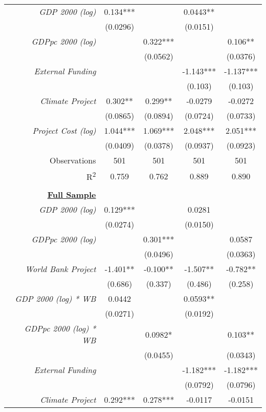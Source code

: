 \documentclass{article}
\begin{document}
\begin{singlespace}
\begin{table}[H]
{\begin{tabular}{rcccc}
				\textit{GDP 2000 (log)} & 0.134*** &  & 0.0443** &  \\
				\textit{} & (0.0296) &  & (0.0151) &  \\
				\textit{GDPpc 2000 (log)} &  & 0.322*** &  & 0.106** \\
				\textit{} &  & (0.0562) &  & (0.0376) \\
				\textit{External Funding} &  &  & -1.143*** & -1.137*** \\
				\textit{} &  &  & (0.103) & (0.103) \\
				\textit{Climate Project} & 0.302** & 0.299** & -0.0279 & -0.0272 \\
				\textit{} & (0.0865) & (0.0894) & (0.0724) & (0.0733) \\
				\textit{Project Cost (log)} & 1.044*** & 1.069*** & 2.048*** & 2.051*** \\
				\textit{} & (0.0409) & (0.0378) & (0.0937) & (0.0923) \\ \hline
				Observations & 501 & 501 & 501 & 501 \\
				R\textsuperscript{2} & 0.759 & 0.762 & 0.889 & 0.890 \\ \hline
				\multicolumn{1}{l}{\textit{}} & \multicolumn{1}{l}{} & \multicolumn{1}{l}{} & \multicolumn{1}{l}{} & \multicolumn{1}{l}{} \\
				{\ul \textbf{Full Sample}} &  &  &  &  \\
				\textit{GDP 2000 (log)} & 0.129*** &  & 0.0281 &  \\
				\textit{} & (0.0274) &  & (0.0150) &  \\
				\textit{GDPpc 2000 (log)} &  & 0.301*** &  & 0.0587 \\
				\textit{} &  & (0.0496) &  & (0.0363) \\
				\textit{World Bank Project} & -1.401** & -0.100** & -1.507** & -0.782** \\
				\textit{} & (0.686) & (0.337) & (0.486) & (0.258) \\
				\textit{GDP 2000 (log) * WB} & 0.0442 &  & 0.0593** &  \\
				\textit{} & (0.0271) &  & (0.0192) &  \\
				\textit{GDPpc 2000 (log) * WB} &  & 0.0982* &  & 0.103** \\
				\textit{} &  & (0.0455) &  & (0.0343) \\
				\textit{External Funding} &  &  & -1.182*** & -1.182*** \\
				\textit{} &  &  & (0.0792) & (0.0796) \\
				\textit{Climate Project} & 0.292*** & 0.278*** & -0.0117 & -0.0151 \\

\end{tabular}}
\end{table}
\end{singlespace}
\end{document}
